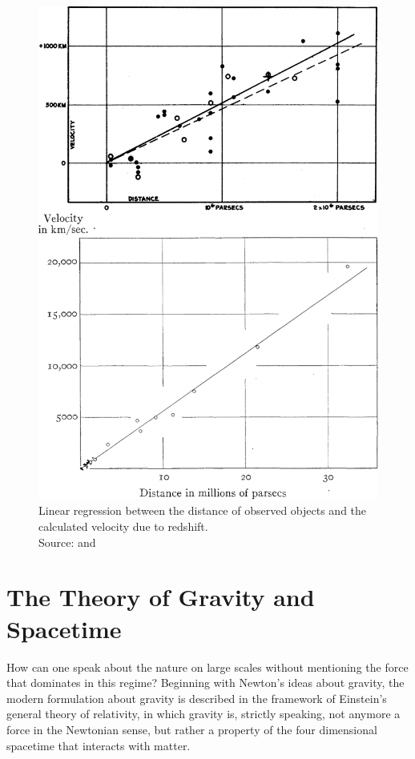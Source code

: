 \begin{figure}[H]
\begin{minipage}{8cm}
        \includegraphics[scale=0.17]{figures/images/hubble_distance-vs-velocity.png}
        \caption{Linear regression between the distance of observed objects and the calculated velocity due to redshift. \\ 
        Source: \cite{Hubble1929} and \cite[Figure 5]{Hubble1931}}
        \label{fig:hubble-law}
    \end{minipage}    
\end{figure}



\section{The Theory of Gravity and Spacetime}
How can one speak about the nature on large scales without mentioning the force that dominates in this regime?
Beginning with Newton's ideas about gravity, the modern formulation about gravity is described in the framework of Einstein's general theory of relativity, in which gravity is, strictly speaking, not anymore a force in the Newtonian sense, but rather a property of the four dimensional spacetime that interacts with matter. \\

